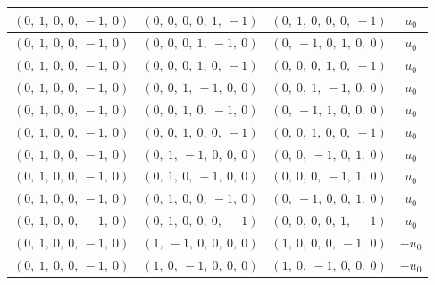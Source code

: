 \documentclass[11pt]{article}
\theoremstyle{definition}
\begin{document}
\begin{longtable}{|l|l|l|c|}
    \hline
    $\left( 0, \  1, \  0, \  0, \  -1, \  0\right)$ & $\left( 0, \  0, \  0, \  0, \  1, \  -1\right)$ & $\left( 0, \  1, \  0, \  0, \  0, \  -1\right)$ & $u_{0}$ \\
    \hline
    $\left( 0, \  1, \  0, \  0, \  -1, \  0\right)$ & $\left( 0, \  0, \  0, \  1, \  -1, \  0\right)$ & $\left( 0, \  -1, \  0, \  1, \  0, \  0\right)$ & $u_{0}$ \\
    \hline
    $\left( 0, \  1, \  0, \  0, \  -1, \  0\right)$ & $\left( 0, \  0, \  0, \  1, \  0, \  -1\right)$ & $\left( 0, \  0, \  0, \  1, \  0, \  -1\right)$ & $u_{0}$ \\
    \hline
    $\left( 0, \  1, \  0, \  0, \  -1, \  0\right)$ & $\left( 0, \  0, \  1, \  -1, \  0, \  0\right)$ & $\left( 0, \  0, \  1, \  -1, \  0, \  0\right)$ & $u_{0}$ \\
    \hline
    $\left( 0, \  1, \  0, \  0, \  -1, \  0\right)$ & $\left( 0, \  0, \  1, \  0, \  -1, \  0\right)$ & $\left( 0, \  -1, \  1, \  0, \  0, \  0\right)$ & $u_{0}$ \\
    \hline
    $\left( 0, \  1, \  0, \  0, \  -1, \  0\right)$ & $\left( 0, \  0, \  1, \  0, \  0, \  -1\right)$ & $\left( 0, \  0, \  1, \  0, \  0, \  -1\right)$ & $u_{0}$ \\
    \hline
    $\left( 0, \  1, \  0, \  0, \  -1, \  0\right)$ & $\left( 0, \  1, \  -1, \  0, \  0, \  0\right)$ & $\left( 0, \  0, \  -1, \  0, \  1, \  0\right)$ & $u_{0}$ \\
    \hline
    $\left( 0, \  1, \  0, \  0, \  -1, \  0\right)$ & $\left( 0, \  1, \  0, \  -1, \  0, \  0\right)$ & $\left( 0, \  0, \  0, \  -1, \  1, \  0\right)$ & $u_{0}$ \\
    \hline
    $\left( 0, \  1, \  0, \  0, \  -1, \  0\right)$ & $\left( 0, \  1, \  0, \  0, \  -1, \  0\right)$ & $\left( 0, \  -1, \  0, \  0, \  1, \  0\right)$ & $u_{0}$ \\
    \hline
    $\left( 0, \  1, \  0, \  0, \  -1, \  0\right)$ & $\left( 0, \  1, \  0, \  0, \  0, \  -1\right)$ & $\left( 0, \  0, \  0, \  0, \  1, \  -1\right)$ & $u_{0}$ \\
    \hline
    $\left( 0, \  1, \  0, \  0, \  -1, \  0\right)$ & $\left( 1, \  -1, \  0, \  0, \  0, \  0\right)$ & $\left( 1, \  0, \  0, \  0, \  -1, \  0\right)$ & $- u_{0}$ \\
    \hline
    $\left( 0, \  1, \  0, \  0, \  -1, \  0\right)$ & $\left( 1, \  0, \  -1, \  0, \  0, \  0\right)$ & $\left( 1, \  0, \  -1, \  0, \  0, \  0\right)$ & $- u_{0}$ \\

\end{longtable}
\end{document}

